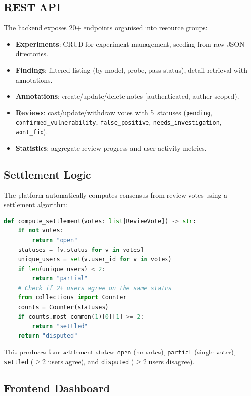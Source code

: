 \documentclass[12pt,a4paper]{report}
\begin{document}
\subsection{REST API}

The backend exposes 20+ endpoints organised into resource groups:
\begin{itemize}
    \item \textbf{Experiments}: CRUD for experiment management, seeding from raw JSON directories.
    \item \textbf{Findings}: filtered listing (by model, probe, pass status), detail retrieval with annotations.
    \item \textbf{Annotations}: create/update/delete notes (authenticated, author-scoped).
    \item \textbf{Reviews}: cast/update/withdraw votes with 5~statuses (\texttt{pending}, \texttt{confirmed\_vulnerability}, \texttt{false\_positive}, \texttt{needs\_investigation}, \texttt{wont\_fix}).
    \item \textbf{Statistics}: aggregate review progress and user activity metrics.
\end{itemize}

\subsection{Settlement Logic}

The platform automatically computes consensus from review votes using a settlement algorithm:

\begin{lstlisting}[language=Python, caption={Vote settlement algorithm.}]
def compute_settlement(votes: list[ReviewVote]) -> str:
    if not votes:
        return "open"
    statuses = [v.status for v in votes]
    unique_users = set(v.user_id for v in votes)
    if len(unique_users) < 2:
        return "partial"
    # Check if 2+ users agree on the same status
    from collections import Counter
    counts = Counter(statuses)
    if counts.most_common(1)[0][1] >= 2:
        return "settled"
    return "disputed"
\end{lstlisting}

This produces four settlement states: \texttt{open} (no votes), \texttt{partial} (single voter), \texttt{settled} ($\geq$2 users agree), and \texttt{disputed} ($\geq$2 users disagree).

\subsection{Frontend Dashboard}
\end{document}
